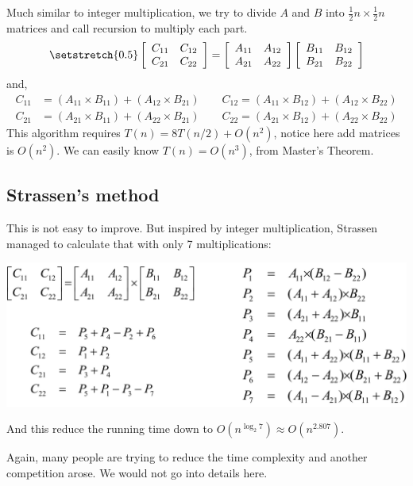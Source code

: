 \begin{spacing}{1.3}
    Much similar to integer multiplication, we try to divide 
    $A$ and $B$ into $\frac{1}{2}n\times \frac{1}{2}n$ matrices 
    and call recursion to multiply each part.
    \begin{align*}
        \setstretch{0.5}
        \left[ \begin{array}{cc}
            C_{11} & C_{12} \\
            C_{21} & C_{22}
        \end{array} \right]
        =
        \left[ \begin{array}{cc}
            A_{11} & A_{12} \\
            A_{21} & A_{22}
        \end{array} \right]
        \left[ \begin{array}{cc}
            B_{11} & B_{12} \\
            B_{21} & B_{22}
        \end{array} \right]
    \end{align*}
    and,
    \begin{align*}
        C_{11} &= (A_{11}\times B_{11}) + (A_{12}\times B_{21}) \qquad 
        C_{12} = (A_{11}\times B_{12}) + (A_{12}\times B_{22}) \\
        C_{21} &= (A_{21}\times B_{11}) + (A_{22}\times B_{21}) \qquad 
        C_{22} = (A_{21}\times B_{12}) + (A_{22}\times B_{22}) 
    \end{align*}
    This algorithm requires $T(n)=8T(n/2)+O(n^2)$, notice 
    here add matrices is $O(n^2)$. We can easily know 
    $T(n)=O(n^3)$, from Master's Theorem.

    \subsection{Strassen's method}

    This is not easy to improve. But inspired by integer multiplication,
    Strassen managed to calculate that with only 7 multiplications:
    \begin{center}
        \includegraphics[scale=0.19]{images/02-matrix-mult.jpg}
    \end{center}
    
    And this reduce the running time down to 
    $O(n^{\log_2 7})\approx O(n^{2.807})$.

    Again, many people are trying to reduce the time complexity 
    and another competition arose. 
    We would not go into details here.


\end{spacing}
